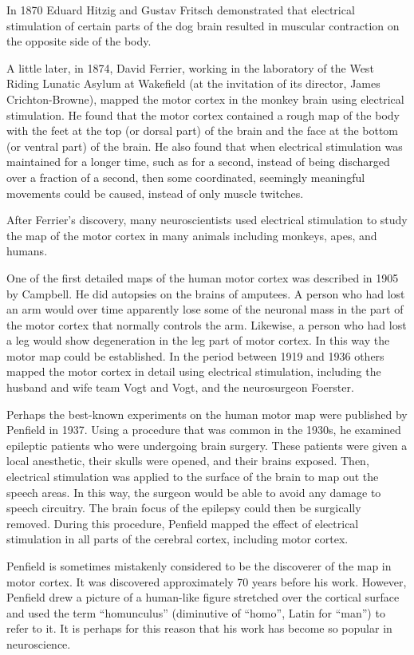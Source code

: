 \documentclass[]{book}
\begin{document}
In 1870 Eduard Hitzig and Gustav Fritsch demonstrated that electrical stimulation of certain parts of the dog brain resulted in muscular contraction on the opposite side of the body.

A little later, in 1874, David Ferrier, working in the laboratory of the West Riding Lunatic Asylum at Wakefield (at the invitation of its director, James Crichton-Browne), mapped the motor cortex in the monkey brain using electrical stimulation. He found that the motor cortex contained a rough map of the body with the feet at the top (or dorsal part) of the brain and the face at the bottom (or ventral part) of the brain. He also found that when electrical stimulation was maintained for a longer time, such as for a second, instead of being discharged over a fraction of a second, then some coordinated, seemingly meaningful movements could be caused, instead of only muscle twitches.

After Ferrier's discovery, many neuroscientists used electrical stimulation to study the map of the motor cortex in many animals including monkeys, apes, and humans.

One of the first detailed maps of the human motor cortex was described in 1905 by Campbell. He did autopsies on the brains of amputees. A person who had lost an arm would over time apparently lose some of the neuronal mass in the part of the motor cortex that normally controls the arm. Likewise, a person who had lost a leg would show degeneration in the leg part of motor cortex. In this way the motor map could be established. In the period between 1919 and 1936 others mapped the motor cortex in detail using electrical stimulation, including the husband and wife team Vogt and Vogt, and the neurosurgeon Foerster.

Perhaps the best-known experiments on the human motor map were published by Penfield in 1937. Using a procedure that was common in the 1930s, he examined epileptic patients who were undergoing brain surgery. These patients were given a local anesthetic, their skulls were opened, and their brains exposed. Then, electrical stimulation was applied to the surface of the brain to map out the speech areas. In this way, the surgeon would be able to avoid any damage to speech circuitry. The brain focus of the epilepsy could then be surgically removed. During this procedure, Penfield mapped the effect of electrical stimulation in all parts of the cerebral cortex, including motor cortex.

Penfield is sometimes mistakenly considered to be the discoverer of the map in motor cortex. It was discovered approximately 70 years before his work. However, Penfield drew a picture of a human-like figure stretched over the cortical surface and used the term ``homunculus'' (diminutive of ``homo'', Latin for ``man'') to refer to it. It is perhaps for this reason that his work has become so popular in neuroscience.
\end{document}
